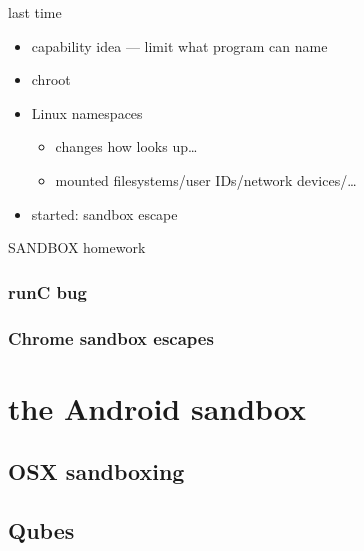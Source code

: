 \date{}
\title{}
\date{}

\begin{frame}
    \titlepage
\end{frame}

\begin{frame}{last time}
    \begin{itemize}
    \item capability idea --- limit what program can name
    \item chroot
    \item Linux namespaces
        \begin{itemize}
        \item changes how looks up\ldots
        \item mounted filesystems/user IDs/network devices/\ldots
        \end{itemize}
    \vspace{.5cm}
    \item started: sandbox escape
    \end{itemize}
\end{frame}

\begin{frame}{SANDBOX homework}
\end{frame}

\subsubsection{runC bug}


\subsubsection{Chrome sandbox escapes}



\section{the Android sandbox}



\subsection{OSX sandboxing}

\subsection{Qubes}


